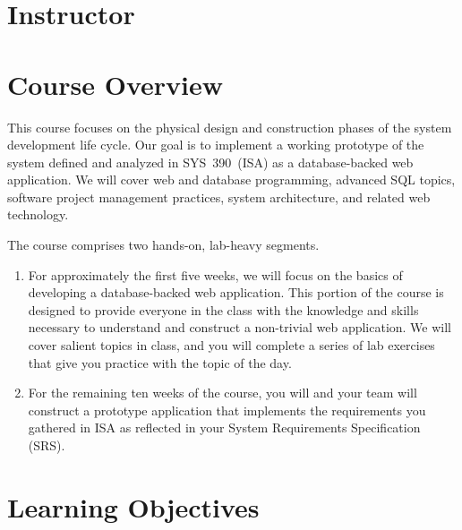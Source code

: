 \documentclass[11pt]{article}
\begin{document}
\section{Instructor}



\section{Course Overview}

This course focuses on the physical design and construction phases
of the system development life cycle.
Our goal is to implement a working prototype
of the system defined and analyzed in SYS~390~(ISA)
as a database-backed web application.
We will cover web and database programming,
advanced SQL topics,
software project management practices,
system architecture,
and related web technology.

The course comprises two hands-on, lab-heavy segments.
\begin{enumerate}
\item
  For approximately the first five weeks,
  we will focus on the basics of developing
  a database-backed web application.
  This portion of the course is designed
  to provide everyone in the class
  with the knowledge and skills
  necessary to understand and construct a non-trivial web application.
  We will cover salient topics in class,
  and you will complete a series of lab exercises
  that give you practice with the topic of the day.
\item
  For the remaining ten weeks of the course,
  you will and your team will construct a prototype application
  that implements the requirements you gathered in ISA
  as reflected in your System Requirements Specification (SRS).
\end{enumerate}

\section{Learning Objectives}
\end{document}
